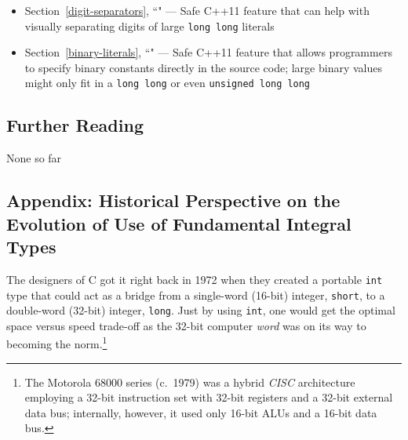 \begin{itemize}
\item{Section~\ref{digit-separators}, ``" — Safe C++11 feature that can help with visually separating digits of large \lstinline!long!~\lstinline!long! literals}
\item{Section~\ref{binary-literals}, ``" — Safe C++11 feature that allows programmers to specify binary constants directly in the source code; large binary values might only fit in a \lstinline!long!~\lstinline!long! or even \lstinline!unsigned!~\lstinline!long!~\lstinline!long!}
\end{itemize}

\subsection[Further Reading]{Further Reading}\label{further-reading}

None so far

\subsection[Appendix: Historical Perspective on the Evolution of Use of Fundamental Integral Types]{Appendix: Historical Perspective on the Evolution of Use of Fundamental Integral Types}\label{longlong-appendix}
\label{historical-perspective-on-the-evolution-of-use-of-fundamental-integral-types}

The designers of C got it right back in 1972 when
they created a portable \lstinline!int! type that could act as a bridge
from a single-word (16-bit) integer, \lstinline!short!, to a double-word
(32-bit) integer, \lstinline!long!. Just by using \lstinline!int!, one would
get the optimal space versus speed trade-off as the 32-bit computer \emph{word}
was on its way to becoming the norm.{\cprotect\footnote{The Motorola
68000 series (c.~1979) was a hybrid \emph{CISC} architecture employing
a 32-bit instruction set with 32-bit registers and a 32-bit external
data bus; internally, however, it used only 16-bit ALUs and a 16-bit
  data bus.}}

